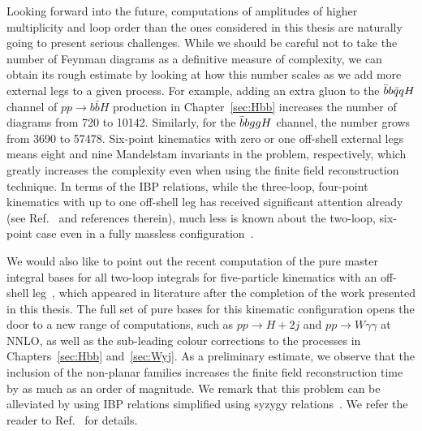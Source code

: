 \documentclass[main.tex]{subfiles}
\begin{document}
Looking forward into the future, computations of amplitudes of higher multiplicity and loop order than the ones considered in this thesis are naturally going to present serious challenges. While we should be careful not to take the number of Feynman diagrams as a definitive measure of complexity, we can obtain its rough estimate by looking at how this number scales as we add more external legs to a given process. For example, adding an extra gluon to the $\bar{b}b\bar{q}qH$ channel of $pp\to b\bar{b}H$ production in Chapter~\ref{sec:Hbb} increases the number of diagrams from 720 to 10142. Similarly, for the $\bar{b}bggH$ channel, the number grows from 3690 to 57478. Six-point kinematics with zero or one off-shell external legs means eight and nine Mandelstam invariants in the problem, respectively, which greatly increases the complexity even when using the finite field reconstruction technique. In terms of the IBP relations, while the three-loop, four-point kinematics with up to one off-shell leg has received significant attention already (see Ref.~\cite{Canko:2023yoe} and references therein), much less is known about the two-loop, six-point case even in a fully massless configuration~\cite{Henn:2022ydo, Henn:2021cyv}.

We would also like to point out the recent computation of the pure master integral bases for all two-loop integrals for five-particle kinematics with an off-shell leg~\cite{Abreu:2023rco}, which appeared in literature after the completion of the work presented in this thesis. The full set of pure bases for this kinematic configuration opens the door to a new range of computations, such as $pp \rightarrow H+2j$ and $pp \rightarrow W \gamma \gamma $ at NNLO, as well as the sub-leading colour corrections to the processes in Chapters~\ref{sec:Hbb} and~\ref{sec:Wyj}. As a preliminary estimate, we observe that the inclusion of the non-planar families increases the finite field reconstruction time by as much as an order of magnitude. We remark that this problem can be alleviated by using IBP relations simplified using syzygy relations~\cite{Gluza:2010ws, 10.1145/1993886.1993902, Schabinger:2011dz, Chen:2015lyz, Bohm:2017qme, Bosma:2018mtf, Boehm:2020zig}. We refer the reader to Ref.~\cite{Wu:2023upw} for details.
\end{document}
